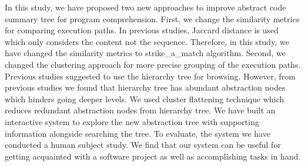 In this study, we have proposed two new approaches to improve abstract code summary tree for program comprehension. First, we change the similarity metrics for comparing execution paths. In previous studies, Jaccard distance is used which only considers the content not the sequence. Therefore, in this study, we have changed the similarity metrics to strike\_a\_match algorithm. Second, we changed the clustering approach for more precise grouping of the execution paths. Previous studies suggested to use the hierarchy tree for browsing. However, from previous studies we found that hierarchy tree has abundant abstraction nodes which hinders going deeper levels.
We used cluster flattening technique which reduces redundant abstraction nodes from hierarchy tree. We have built an interactive system to explore the new abstraction tree with supporting information alongside searching the tree. To evaluate, the system we have conducted a human subject study. We find that our system can be useful for getting acquainted with a software project as well as accomplishing tasks in hand.  
